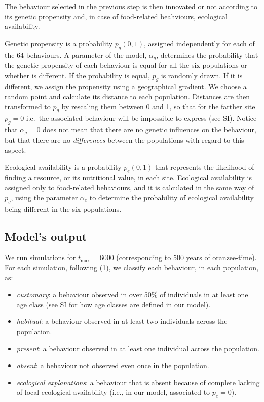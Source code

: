 \documentclass[9pt,twocolumn,twoside,]{pnas-new}
\begin{document}
The behaviour selected in the previous step is then innovated or not
according to its genetic propensity and, in case of food-related
beahviours, ecological availability.

Genetic propensity is a probability \(p_g(0,1)\), assigned independently
for each of the 64 behaviours. A parameter of the model, \(\alpha_g\),
determines the probability that the genetic propensity of each behaviour
is equal for all the six populations or whether is different. If the
probability is equal, \(p_g\) is randomly drawn. If it is different, we
assign the propensity using a geographical gradient. We choose a random
point and calculate its distance to each population. Distances are then
transformed to \(p_g\) by rescaling them between 0 and 1, so that for
the farther site \(p_g=0\) i.e.~the associated behaviour will be
impossible to express (see SI). Notice that \(\alpha_g=0\) does not mean
that there are no genetic influences on the behaviour, but that there
are no \emph{differences} between the populations with regard to this
aspect.

Ecological availability is a probability \(p_e(0,1)\) that represents
the likelihood of finding a resource, or its nutritional value, in each
site. Ecological availability is assigned only to food-related
behaviours, and it is calculated in the same way of \(p_g\), using the
parameter \(\alpha_e\) to determine the probability of ecological
availability being different in the six populations.

\subsection*{Model's output}\label{format}

We run simulations for \(t_\text{max}=6000\) (corresponding to 500 years
of oranzee-time). For each simulation, following (1), we classify each
behaviour, in each population, as:

\begin{itemize}
\item
  \emph{customary}: a behaviour observed in over 50\% of individuals in
  at least one age class (see SI for how age classes are defined in our
  model).
\item
  \emph{habitual}: a behaviour observed in at least two individuals
  across the population.
\item
  \emph{present}: a behaviour observed in at least one individual across
  the population.
\item
  \emph{absent}: a behaviour not observed even once in the population.
\item
  \emph{ecological explanations}: a behaviour that is absent because of
  complete lacking of local ecological availability (i.e., in our model,
  associated to \(p_e=0\)).
\end{itemize}
\end{document}
